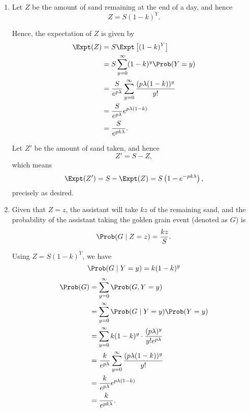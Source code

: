 \begin{enumerate}
    \item Let \(Z\) be the amount of sand remaining at the end of a day, and hence
          \[
              Z = S (1 - k)^{Y}.
          \]

          Hence, the expectation of \(Z\) is given by
          \begin{align*}
              \Expt(Z) & = S \Expt\left[(1 - k)^Y\right]                                                 \\
                       & = S \sum_{y = 0}^{\infty} (1 - k)^y \Prob(Y = y)                                \\
                       & = \frac{S}{e^{p\lambda}} \sum_{y = 0}^{\infty} \frac{(p \lambda (1 - k))^y}{y!} \\
                       & = \frac{S}{e^{p\lambda}} e^{p \lambda(1 - k)}                                   \\
                       & = \frac{S}{e^{pk\lambda}}.
          \end{align*}

          Let \(Z'\) be the amount of sand taken, and hence
          \[
              Z' = S - Z,
          \]
          which means
          \[
              \Expt(Z') = S - \Expt(Z) = S \left(1 - e^{-pk\lambda}\right),
          \]
          precisely as desired.

    \item Given that \(Z = z\), the assistant will take \(kz\) of the remaining sand, and the probability of the assistant taking the golden grain event (denoted as \(G\)) is
          \[
              \Prob(G \mid Z = z) = \frac{kz}{S}.
          \]

          Using \(Z = S (1 - k)^Y\), we have
          \[
              \Prob(G \mid Y = y) = k (1 - k)^y
          \]
          \begin{align*}
              \Prob(G) & = \sum_{y = 0}^{\infty} \Prob(G, Y = y)                                          \\
                       & = \sum_{y = 0}^{\infty} \Prob(G \mid Y = y) \Prob(Y = y)                         \\
                       & = \sum_{y = 0}^{\infty} k (1 - k)^y \cdot \frac{(p \lambda)^y}{y! e^{p\lambda}}  \\
                       & = \frac{k}{e^{p \lambda}} \sum_{y = 0}^{\infty} \frac{(p \lambda (1 - k))^y}{y!} \\
                       & = \frac{k}{e^{p \lambda}} e^{p \lambda (1 - k)}                                  \\
                       & = \frac{k}{e^{p k \lambda}}.
          \end{align*}


\end{enumerate}
